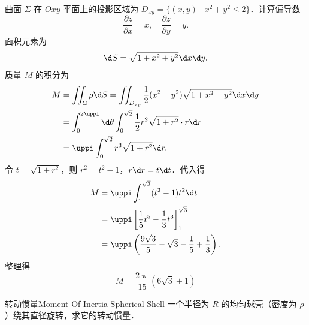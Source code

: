 \begin{solution}
    曲面 $\Sigma$ 在 $Oxy$ 平面上的投影区域为 $D_{xy} = \{ (x, y) \mid x^2 + y^2 \le 2 \}$．计算偏导数
    \begin{equation}
        \frac{\partial z}{\partial x} = x, \quad \frac{\partial z}{\partial y} = y.
    \end{equation}
    面积元素为
    \begin{equation}
        \d S = \sqrt{1 + x^2 + y^2} \d x \d y.
    \end{equation}
    质量 $M$ 的积分为
    \begin{equation}
        \begin{aligned}
            M & = \iint_{\Sigma} \rho \d S = \iint_{D_{xy}} \frac{1}{2}(x^2 + y^2) \sqrt{1 + x^2 + y^2} \d x \d y \\
              & = \int_0^{2\uppi} \d \theta \int_0^{\sqrt{2}} \frac{1}{2} r^2 \sqrt{1 + r^2} \cdot r \d r         \\
              & = \uppi \int_0^{\sqrt{2}} r^3 \sqrt{1 + r^2} \d r.
        \end{aligned}
    \end{equation}
    令 $t = \sqrt{1 + r^2}$，则 $r^2 = t^2 - 1$，$r \d r = t \d t$．代入得
    \begin{equation}
        \begin{aligned}
            M & = \uppi \int_1^{\sqrt{3}} (t^2 - 1) t^2 \d t                                       \\
              & = \uppi \left[ \frac{1}{5} t^5 - \frac{1}{3} t^3 \right]_1^{\sqrt{3}}              \\
              & = \uppi \left( \frac{9\sqrt{3}}{5} - \sqrt{3} - \frac{1}{5} + \frac{1}{3} \right).
        \end{aligned}
    \end{equation}
    整理得
    \begin{equation}
        \boxed{M = \frac{2\uppi}{15} (6\sqrt{3} + 1)}
    \end{equation}
\end{solution}

\begin{problem}{转动惯量}{Moment-Of-Inertia-Spherical-Shell}
    一个半径为 $R$ 的均匀球壳（密度为 $\rho$）绕其直径旋转，求它的转动惯量．
\end{problem}

